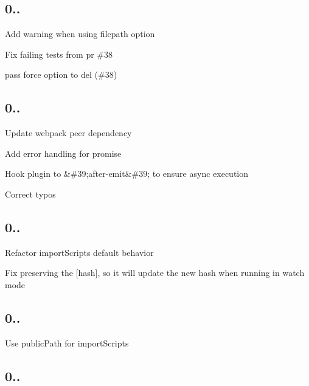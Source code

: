 \subsection*{0..}


\begin{DoxyItemize}
\item Add warning when using filepath option
\item Fix failing tests from pr \#38
\item pass force option to {\ttfamily del} (\#38)
\end{DoxyItemize}

\subsection*{0..}


\begin{DoxyItemize}
\item Update webpack peer dependency
\item Add error handling for promise
\item Hook plugin to \&\#39;after-\/emit\&\#39; to ensure async execution
\item Correct typos
\end{DoxyItemize}

\subsection*{0..}


\begin{DoxyItemize}
\item Refactor import\+Scripts default behavior
\item Fix preserving the \mbox{[}hash\mbox{]}, so it will update the new hash when running in watch mode
\end{DoxyItemize}

\subsection*{0..}


\begin{DoxyItemize}
\item Use public\+Path for import\+Scripts
\end{DoxyItemize}

\subsection*{0..}


